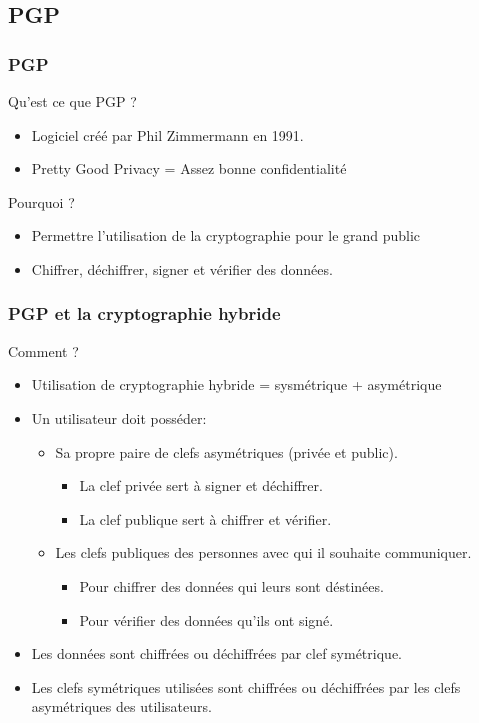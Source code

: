 \subsection{PGP}
\begin{frame}
    \frametitle{\color{white}PGP}
    \begin{block}{Qu'est ce que PGP ?}
    	\begin{itemize}
    	 \item Logiciel créé par Phil Zimmermann en 1991.
         \item Pretty Good Privacy = Assez bonne confidentialité
       \end{itemize} 
    \end{block}
    \begin{block}{Pourquoi ?}
    	\begin{itemize}
         \item Permettre l'utilisation de la cryptographie pour le grand public
         \item Chiffrer, déchiffrer, signer et vérifier des données. 
       \end{itemize} 
    \end{block}
\end{frame}
\begin{frame}
    \frametitle{\color{white}PGP et la cryptographie hybride}
    \begin{block}{Comment ?}
    	\begin{itemize}
         \item Utilisation de cryptographie hybride = sysmétrique + asymétrique
         \item Un utilisateur doit posséder:
	  \begin{itemize}
	    \item Sa propre paire de clefs asymétriques (privée et public).
	    \begin{itemize}
	      \item La clef privée sert à signer et déchiffrer.
	      \item La clef publique sert à chiffrer et vérifier.
	    \end{itemize}
	    \item Les clefs publiques des personnes avec qui il souhaite communiquer.
	    \begin{itemize}
	      \item Pour chiffrer des données qui leurs sont déstinées.
	      \item Pour vérifier des données qu'ils ont signé.
	    \end{itemize}
	  \end{itemize}
	  \item Les données sont chiffrées ou déchiffrées par clef symétrique.
	  \item Les clefs symétriques utilisées sont chiffrées ou déchiffrées par les clefs asymétriques des utilisateurs.
       \end{itemize} 
    \end{block}
\end{frame}

